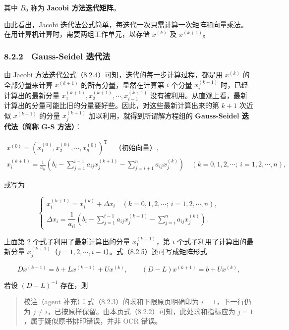 其中 \(B_0\) 称为 \textbf{Jacobi 方法迭代矩阵}。

由此看出，Jacobi 迭代法公式简单，每迭代一次只需计算一次矩阵和向量乘法。在用计算机计算时，需要两组工作单元，以存储 \(x^{(k)}\) 及 \(x^{(k+1)}\)。

\subsubsection{8.2.2　Gauss-Seidel 迭代法}\label{ch08-gauss-seidel-ux8fedux4ee3ux6cd5}

由 Jacobi 方法迭代公式（8.2.4）可知，迭代的每一步计算过程，都是用 \(x^{(k)}\) 的全部分量来计算 \(x^{(k+1)}\) 的所有分量，显然在计算第 \(i\) 个分量 \(x_i^{(k+1)}\) 时，已经计算出的最新分量 \(x_1^{(k+1)},x_2^{(k+1)},\cdots,x_{i-1}^{(k+1)}\) 没有被利用。从直观上看，最新计算出的分量可能比旧的分量要好些。因此，对这些最新计算出来的第 \(k+1\) 次近似 \(x^{(k+1)}\) 的分量 \(x_j^{(k+1)}\) 加以利用，就得到所谓解方程组的 \textbf{Gauss-Seidel 迭代法（简称 G-S 方法）}：

\[
\begin{gathered}
x^{(0)}=(x_1^{(0)},x_2^{(0)},\cdots,x_n^{(0)})^{\mathrm T}\quad\text{（初始向量）},\\[4pt]
x_i^{(k+1)}=\frac1{a_{ii}}\left(b_i-\sum_{j=1}^{i-1}a_{ij}x_j^{(k+1)}-\sum_{j=i+1}^{n}a_{ij}x_j^{(k)}\right)\quad(k=0,1,2,\cdots;\ i=1,2,\cdots,n),
\end{gathered}
\tag{8.2.5}
\]

或写为

\[
\begin{cases}
x_i^{(k+1)}=x_i^{(k)}+\Delta x_i\quad(k=0,1,2,\cdots;\ i=1,2,\cdots,n),\\[4pt]
\Delta x_i=\dfrac1{a_{ii}}\left(b_i-\displaystyle\sum_{j=1}^{i-1}a_{ij}x_j^{(k+1)}-\displaystyle\sum_{j=i}^{n}a_{ij}x_j^{(k)}\right).
\end{cases}
\tag{8.2.5'}
\]

上面第 2 个式子利用了最新计算出的分量 \(x_1^{(k+1)}\)，第 \(i\) 个式子利用了计算出的最新分量 \(x_j^{(k+1)}\)（\(j=1,2,\cdots,i-1\)）。式（8.2.5）还可写成矩阵形式

\[
Dx^{(k+1)}=b+Lx^{(k+1)}+Ux^{(k)},\qquad(D-L)x^{(k+1)}=b+Ux^{(k)},
\]

若设 \((D-L)^{-1}\) 存在，则

\begin{quote}
校注（agent 补充）：式（8.2.3）的求和下限原页明确印为 \(i=1\)，下一行仍为 \(j\neq i\)，已按原样保留。由本页式（8.2.2）可知，此处求和指标应为 \(j=1\)，属于疑似原书排印错误，并非 OCR 错误。
\end{quote}

